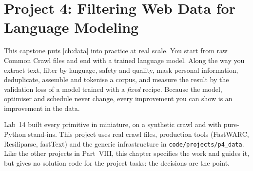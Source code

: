 \chapter{Project 4: Filtering Web Data for Language Modeling}\label{ch:proj4}

This capstone puts \cref{ch:data} into practice at real scale. You start from raw Common Crawl
files and end with a trained language model. Along the way you extract text, filter by language,
safety and quality, mask personal information, deduplicate, assemble and tokenise a corpus, and
measure the result by the validation loss of a model trained with a \emph{fixed} recipe. Because the
model, optimiser and schedule never change, every improvement you can show is an improvement in the
data.

Lab~14 built every primitive in miniature, on a synthetic crawl and with pure-Python stand-ins.
This project uses real crawl files, production tools (FastWARC, Resiliparse, fastText) and the
generic infrastructure in \texttt{code/projects/p4\_data}. Like the other projects in Part~VIII, this
chapter specifies the work and guides it, but gives no solution code for the project tasks: the
decisions are the point.

